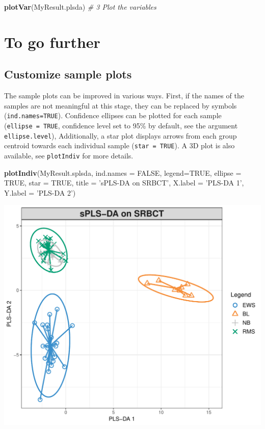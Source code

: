 \documentclass[]{book}
\newenvironment{Shaded}{\begin{snugshade}}{\end{snugshade}}
\newcommand{\CommentTok}[1]{\textcolor[rgb]{0.56,0.35,0.01}{\textit{#1}}}
\newcommand{\DataTypeTok}[1]{\textcolor[rgb]{0.13,0.29,0.53}{#1}}
\newcommand{\KeywordTok}[1]{\textcolor[rgb]{0.13,0.29,0.53}{\textbf{#1}}}
\newcommand{\NormalTok}[1]{#1}
\newcommand{\OtherTok}[1]{\textcolor[rgb]{0.56,0.35,0.01}{#1}}
\newcommand{\StringTok}[1]{\textcolor[rgb]{0.31,0.60,0.02}{#1}}
\begin{document}
\begin{Shaded}
\begin{Highlighting}[]
\KeywordTok{plotVar}\NormalTok{(MyResult.plsda)      }\CommentTok{# 3 Plot the variables}
\end{Highlighting}
\end{Shaded}

\hypertarget{plsda-tgf}{%
\section{To go further}\label{plsda-tgf}}

\hypertarget{splsda:plotIndiv}{%
\subsection{Customize sample plots}\label{splsda:plotIndiv}}

The sample plots can be improved in various ways. First, if the names of the samples are not meaningful at this stage, they can be replaced by symbols (\texttt{ind.names=TRUE}). Confidence ellipses can be plotted for each sample (\texttt{ellipse\ =\ TRUE}, confidence level set to 95\% by default, see the argument \texttt{ellipse.level}), Additionally, a star plot displays arrows from each group centroid towards each individual sample (\texttt{star\ =\ TRUE}). A 3D plot is also available, see \texttt{plotIndiv} for more details.

\begin{Shaded}
\begin{Highlighting}[]
\KeywordTok{plotIndiv}\NormalTok{(MyResult.splsda, }\DataTypeTok{ind.names =} \OtherTok{FALSE}\NormalTok{, }\DataTypeTok{legend=}\OtherTok{TRUE}\NormalTok{,}
          \DataTypeTok{ellipse =} \OtherTok{TRUE}\NormalTok{, }\DataTypeTok{star =} \OtherTok{TRUE}\NormalTok{, }\DataTypeTok{title =} \StringTok{'sPLS-DA on SRBCT'}\NormalTok{,}
          \DataTypeTok{X.label =} \StringTok{'PLS-DA 1'}\NormalTok{, }\DataTypeTok{Y.label =} \StringTok{'PLS-DA 2'}\NormalTok{)}
\end{Highlighting}
\end{Shaded}

\begin{center}\includegraphics[width=0.5\linewidth]{Figures/04-plsda-plotindiv-args-1} \end{center}
\end{document}
